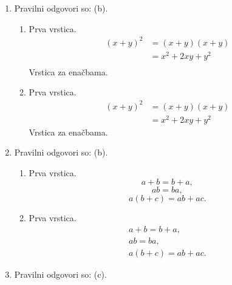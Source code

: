 \documentclass[11pt]{article}
\begin{document}
\begin{enumerate}
    \item Pravilni odgovori so: (b).%
    \begin{enumerate}
        \item Prva vrstica.
\begin{align*}
  (x + y)^2 &= (x + y)(x + y) \\
  &= x^2 + 2 x y + y^2 \\
\end{align*}
        Vrstica za enačbama.
        \item Prva vrstica.
\begin{align*}
  (x + y)^2 &= (x + y)(x + y) \\
  &= x^2 + 2 x y + y^2
\end{align*}
        Vrstica za enačbama.
    \end{enumerate}

    \item Pravilni odgovori so: (b).%
    \begin{enumerate}
        \item Prva vrstica.
\[ a + b = b + a, \]
\[ a b = b a, \]
\[ a (b + c) = a b + a c. \]
        \item Prva vrstica.
\begin{gather*}
  a + b = b + a, \\
  a b = b a, \\
  a (b + c) = a b + a c.
\end{gather*}
    \end{enumerate}

    \item Pravilni odgovori so: (c).%

\end{enumerate}
\end{document}
